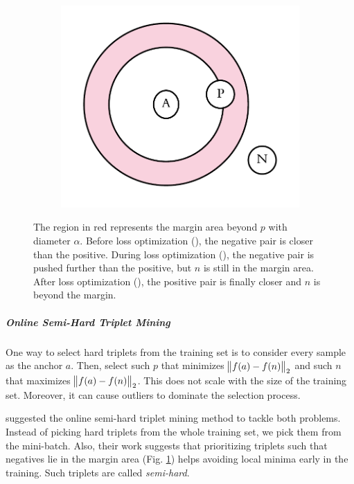 \begin{figure}[ht]
\begin{subfigure}[t]{0.25\textwidth}
		\subcaption{}\label{fig:triplet:b}
	\end{subfigure}%
	\hspace{1cm}%
	\begin{subfigure}[t]{0.25\textwidth}
		\includegraphics[width=\linewidth]{imgs/triplet_loss_after.pdf}
		\subcaption{}\label{fig:triplet:c}
	\end{subfigure}%
	\caption{The region in red represents the margin area beyond $p$ with diameter $\alpha$. Before loss optimization (), the negative pair is closer than the positive. During loss optimization (), the negative pair is pushed further than the positive, but $n$ is still in the margin area. After loss optimization (), the positive pair is finally closer and $n$ is beyond the margin.}
	\label{fig:triplet}
\end{figure}

\subparagraph*{Online Semi-Hard Triplet Mining} One way to select hard triplets from the training set is to consider every sample as the anchor $a$. Then, select such $p$ that minimizes $\norm{f(a) - f(n)}_2$ and such $n$ that maximizes $\norm{f(a) - f(n)}_2$. This does not scale with the size of the training set. Moreover, it can cause outliers to dominate the selection process. 

 suggested the online semi-hard triplet mining method to tackle both problems. Instead of picking hard triplets from the whole training set, we pick them from the mini-batch. Also, their work suggests that prioritizing triplets such that negatives lie in the margin area (Fig. \ref{fig:triplet:b}) helps avoiding local minima early in the training. Such triplets are called \textit{semi-hard}.

